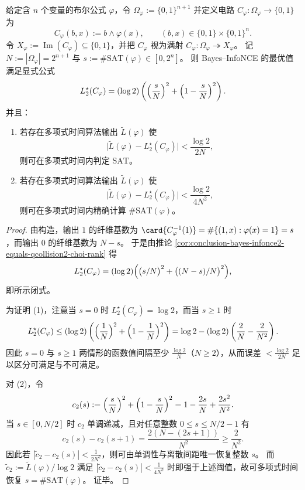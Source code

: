 \begin{theorem}\label{thm:conclusion-bayes-infonce2-sat-threshold-explicit}
给定含 \(n\) 个变量的布尔公式 \(\varphi\)，令
\(
\Omega_\varphi:=\{0,1\}^{n+1}
\)
并定义电路 \(C_\varphi:\Omega_\varphi\to\{0,1\}\) 为
\[
C_\varphi(b,x):=b\wedge \varphi(x),
\qquad
(b,x)\in\{0,1\}\times\{0,1\}^n.
\]
令 \(X_\varphi:=\operatorname{Im}(C_\varphi)\subseteq\{0,1\}\)，并把 \(C_\varphi\) 视为满射 \(C_\varphi:\Omega_\varphi\twoheadrightarrow X_\varphi\)。
记 \(N:=|\Omega_\varphi|=2^{n+1}\) 与 \(s:=\#\mathrm{SAT}(\varphi)\in[0,2^n]\)。
则 Bayes--InfoNCE 的最优值满足显式公式
\[
L_2^\star(C_\varphi)
=(\log 2)\left(\Bigl(\frac{s}{N}\Bigr)^2+\Bigl(1-\frac{s}{N}\Bigr)^2\right).
\]
并且：
\begin{enumerate}
  \item 若存在多项式时间算法输出 \(\widetilde L(\varphi)\) 使
  \[
  \bigl|\widetilde L(\varphi)-L_2^\star(C_\varphi)\bigr|<\frac{\log 2}{2N},
  \]
  则可在多项式时间内判定 \(\mathrm{SAT}\)。
  \item 若存在多项式时间算法输出 \(\widetilde L(\varphi)\) 使
  \[
  \bigl|\widetilde L(\varphi)-L_2^\star(C_\varphi)\bigr|<\frac{\log 2}{4N^2},
  \]
  则可在多项式时间内精确计算 \(\#\mathrm{SAT}(\varphi)\)。
\end{enumerate}
\end{theorem}
\begin{proof}
由构造，输出 \(1\) 的纤维基数为
\(
\card{C_\varphi^{-1}(1)}=\#\{(1,x):\varphi(x)=1\}=s
\)，而输出 \(0\) 的纤维基数为 \(N-s\)。
于是由推论 \ref{cor:conclusion-bayes-infonce2-equals-qcollision2-choi-rank} 得
\[
L_2^\star(C_\varphi)
=(\log 2)\Bigl(\bigl(s/N\bigr)^2+\bigl((N-s)/N\bigr)^2\Bigr),
\]
即所示闭式。

为证明 (1)，注意当 \(s=0\) 时 \(L_2^\star(C_\varphi)=\log 2\)，而当 \(s\ge 1\) 时
\[
L_2^\star(C_\varphi)
\le (\log 2)\left(\Bigl(\frac{1}{N}\Bigr)^2+\Bigl(1-\frac{1}{N}\Bigr)^2\right)
=\log 2-(\log 2)\left(\frac{2}{N}-\frac{2}{N^2}\right).
\]
因此 \(s=0\) 与 \(s\ge 1\) 两情形的函数值间隔至少 \(\frac{\log 2}{N}\)（\(N\ge 2\)），从而误差 \(<\frac{\log 2}{2N}\) 足以区分可满足与不可满足。

对 (2)，令
\[
c_2(s):=\Bigl(\frac{s}{N}\Bigr)^2+\Bigl(1-\frac{s}{N}\Bigr)^2
=1-\frac{2s}{N}+\frac{2s^2}{N^2}.
\]
当 \(s\in[0,N/2]\) 时 \(c_2\) 单调递减，且对任意整数 \(0\le s\le N/2-1\) 有
\[
c_2(s)-c_2(s+1)=\frac{2(N-(2s+1))}{N^2}\ge \frac{2}{N^2}.
\]
因此若 \(|\widetilde c_2-c_2(s)|<\frac{1}{2N^2}\)，则可由单调性与离散间距唯一恢复整数 \(s\)。
而
\(
\widetilde c_2:=\widetilde L(\varphi)/\log 2
\)
满足
\(
|\widetilde c_2-c_2(s)|<\frac{1}{4N^2}
\)
时即强于上述阈值，故可多项式时间恢复 \(s=\#\mathrm{SAT}(\varphi)\)。
证毕。
\end{proof}

